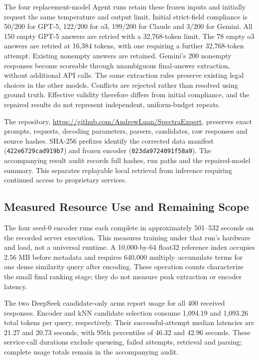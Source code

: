 The four replacement-model Agent runs retain these frozen inputs and initially request the same temperature and output limit. Initial strict-field compliance is 50/200 for GPT-5, 122/200 for o3, 199/200 for Claude and 3/200 for Gemini. All 150 empty GPT-5 answers are retried with a 32,768-token limit. The 78 empty o3 answers are retried at 16,384 tokens, with one requiring a further 32,768-token attempt. Existing nonempty answers are retained. Gemini's 200 nonempty responses become scoreable through unambiguous final-answer extraction, without additional API calls. The same extraction rules preserve existing legal choices in the other models. Conflicts are rejected rather than resolved using ground truth. Effective validity therefore differs from initial compliance, and the repaired results do not represent independent, uniform-budget repeats.

The repository, \url{https://github.com/AndrewLuan/SpectraExpert}, preserves exact prompts, requests, decoding parameters, parsers, candidates, raw responses and source hashes. SHA-256 prefixes identify the corrected data manifest (\texttt{422e6729cad919b7}) and frozen encoder (\texttt{023da9724091f58a9}). The accompanying result audit records full hashes, run paths and the repaired-model summary. This separates replayable local retrieval from inference requiring continued access to proprietary services.

\subsection{Measured Resource Use and Remaining Scope}\label{sec:cost}
The four seed-0 encoder runs each complete in approximately 501--532 seconds on the recorded server execution. This measures training under that run's hardware and load, not a universal runtime. A 10,000-by-64 float32 reference index occupies 2.56 MB before metadata and requires 640,000 multiply--accumulate terms for one dense similarity query after encoding. These operation counts characterize the small final ranking stage; they do not measure peak extraction or encoder latency.

The two DeepSeek candidate-only arms report usage for all 400 received responses. Encoder and kNN candidate selection consume 1,094.19 and 1,093.26 total tokens per query, respectively. Their successful-attempt median latencies are 21.27 and 20.73 seconds, with 95th percentiles of 46.32 and 42.96 seconds. These service-call durations exclude queueing, failed attempts, retrieval and parsing; complete usage totals remain in the accompanying audit.

